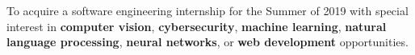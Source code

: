 

\begin{cvparagraph}

To acquire a software engineering internship for the Summer of 2019 with special
interest in \textbf{computer vision}, \textbf{cybersecurity}, \textbf{machine
learning}, \textbf{natural language processing}, \textbf{neural networks}, or
\textbf{web development} opportunities.

\end{cvparagraph}
